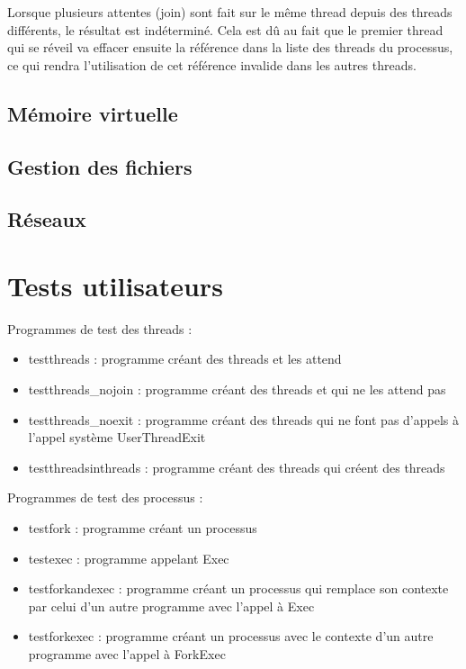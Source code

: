 \documentclass{article}
\begin{document}
Lorsque plusieurs attentes (join) sont fait sur le même thread depuis des threads différents, le résultat est indéterminé. Cela est dû au fait que le premier thread qui se réveil va effacer ensuite la référence dans la liste des threads du processus, ce qui rendra l'utilisation de cet référence invalide dans les autres threads.

\subsection{Mémoire virtuelle}
\subsection{Gestion des fichiers}
\subsection{Réseaux}

\section{Tests utilisateurs}

Programmes de test des threads :

\begin{itemize}
  \item testthreads : programme créant des threads et les attend
  \item testthreads\_nojoin : programme créant des threads et qui ne les attend pas
  \item testthreads\_noexit : programme créant des threads qui ne font pas d'appels à l'appel
  système UserThreadExit
  \item testthreadsinthreads : programme créant des threads qui créent des threads

\end{itemize}

Programmes de test des processus :

\begin{itemize}
  \item testfork : programme créant un processus
  \item testexec : programme appelant Exec
  \item testforkandexec : programme créant un processus qui remplace son contexte par celui d'un autre programme avec l'appel à Exec
  \item testforkexec : programme créant un processus avec le contexte d'un autre programme avec l'appel à ForkExec
\end{itemize}
\end{document}
